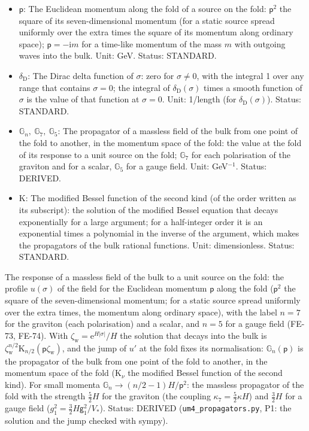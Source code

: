 \documentclass[
  10pt,
]{article}
\begin{document}
\begin{itemize}
  Unit: dimensionless (a relative amplitude); length in a propagator.
  Status: DERIVED.
\item
  \(\mathsf{p}\): The Euclidean momentum along the fold of a source on
  the fold: \(\mathsf{p}^2\) the square of its seven-dimensional
  momentum (for a static source spread uniformly over the extra times
  the square of its momentum along ordinary space);
  \(\mathsf{p} = -\mathrm{i}m\) for a time-like momentum of the mass
  \(m\) with outgoing waves into the bulk. Unit: GeV. Status: STANDARD.
\item
  \(\delta_{\mathrm{D}}\): The Dirac delta function of \(\sigma\): zero
  for \(\sigma \ne 0\), with the integral 1 over any range that contains
  \(\sigma = 0\); the integral of \(\delta_{\mathrm{D}}(\sigma)\) times
  a smooth function of \(\sigma\) is the value of that function at
  \(\sigma = 0\). Unit: 1/length (for \(\delta_{\mathrm{D}}(\sigma)\)).
  Status: STANDARD.
\item
  \(\mathbb{G}_n,\ \mathbb{G}_7,\ \mathbb{G}_5\): The propagator of a
  massless field of the bulk from one point of the fold to another, in
  the momentum space of the fold: the value at the fold of its response
  to a unit source on the fold; \(\mathbb{G}_7\) for each polarisation
  of the graviton and for a scalar, \(\mathbb{G}_5\) for a gauge field.
  Unit: GeV\(^{-1}\). Status: DERIVED.
\item
  \(\mathrm{K}\): The modified Bessel function of the second kind (of
  the order written as its subscript): the solution of the modified
  Bessel equation that decays exponentially for a large argument; for a
  half-integer order it is an exponential times a polynomial in the
  inverse of the argument, which makes the propagators of the bulk
  rational functions. Unit: dimensionless. Status: STANDARD.
\end{itemize}

The response of a massless field of the bulk to a unit source on the
fold: the profile \(u(\sigma)\) of the field for the Euclidean momentum
\(\mathsf{p}\) along the fold (\(\mathsf{p}^2\) the square of the
seven-dimensional momentum; for a static source spread uniformly over
the extra times, the momentum along ordinary space), with the label
\(n = 7\) for the graviton (each polarisation) and a scalar, and
\(n = 5\) for a gauge field (FE-73, FE-74). With
\(\zeta_{\mathrm{w}} = \mathrm{e}^{H\lvert\sigma\rvert}/H\) the solution
that decays into the bulk is
\(\zeta_{\mathrm{w}}^{n/2}\mathrm{K}_{n/2}(\mathsf{p}\zeta_{\mathrm{w}})\),
and the jump of \(u'\) at the fold fixes its normalisation:
\(\mathbb{G}_n(\mathsf{p})\) is the propagator of the bulk from one
point of the fold to another, in the momentum space of the fold
(\(\mathrm{K}_\nu\) the modified Bessel function of the second kind).
For small momenta \(\mathbb{G}_n \to (n/2 - 1)H/\mathsf{p}^2\): the
massless propagator of the fold with the strength \(\frac52H\) for the
graviton (the coupling \(\kappa_7 = \frac52\kappa H\)) and \(\frac32H\)
for a gauge field (\(g_1^2 = \frac32H\mathsf{g}_1^2/V_*\)). Status:
DERIVED (\texttt{um4\_propagators.py}, P1: the solution and the jump
checked with sympy).
\end{document}
